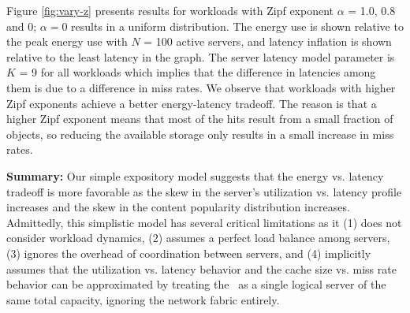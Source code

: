 

						

Figure \ref{fig:vary-z} presents results for workloads with Zipf exponent $\alpha$ = 1.0, 0.8 and 0; $\alpha = 0$ results in a uniform distribution. The energy use is shown relative to the peak energy use with $N$ = 100 active servers, and latency inflation is shown relative to the least latency in the graph. The server  latency model parameter is $K$ = 9 for all workloads which implies that the difference in latencies among them is due to a difference in  miss rates. We observe that workloads with higher Zipf exponents achieve a better energy-latency tradeoff. The reason is that a higher Zipf exponent means that most of the hits result from a small fraction of objects, so reducing the available storage only results in a small increase in miss rates. 
	

\textbf{Summary:}
Our simple expository model suggests that the energy vs. latency tradeoff is more favorable as the skew in the server's utilization vs. latency profile increases and the skew in the content popularity distribution increases. Admittedly, this simplistic model has several critical limitations as it (1) does not consider workload dynamics, (2) assumes a perfect load balance among servers, (3) ignores the overhead of coordination between servers, and (4) implicitly assumes that the utilization vs. latency behavior and the cache size vs. miss rate behavior can be approximated by treating the \cdc\ as a single logical server of the same total capacity, ignoring the network fabric entirely. 

